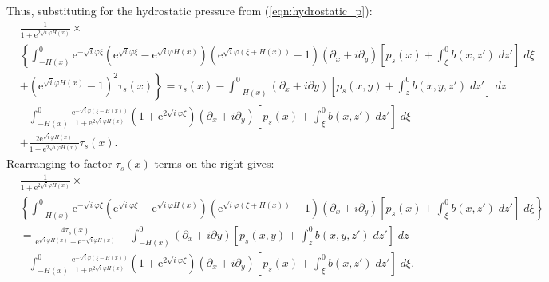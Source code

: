 \documentclass[10pt]{amsart}
\begin{document}
Thus, substituting for the hydrostatic pressure from (\ref{eqn:hydrostatic_p}):
 \begin{align}
& \frac{1}{{ 1 + \mathrm{e}^{2 \sqrt{i} \varphi H(x )} } } \times \nonumber \\
& \left\{
 \int_{-H(x)}^{0} 
\mathrm{e}^{-\sqrt{i} \varphi \xi} 
\left(
\mathrm{e}^{\sqrt{i} \varphi \xi} - 
\mathrm{e}^{\sqrt{i} \varphi H(x)} 
\right) \left(
\mathrm{e}^{\sqrt{i} \varphi  \left( \xi + H(x) \right)} - 1
\right)
 \left( \partial_x  + i \partial_y  \right)
\left[
 p_s (x) + \int_{\xi}^{0} b(x,z') \; dz'  \right]
 \; d \xi   \right. \nonumber \\
& + \left.
\left( 
\mathrm{e}^{\sqrt{i} \varphi  H(x) }   - 1   
\right)^2
\tau_s (x)  \right\} 
 = \tau_s (x) 
 - 
 \int_{-H(x)}^{0} \left( \partial_x + i \partial y \right) \left[ 
 p_s(x,y) + \int_{z}^{0} b(x,y,z') \; dz'
 \right] \; dz  
  \nonumber \\
&- 
\int_{-H(x)}^{0} 
\frac{ \mathrm{e}^{-\sqrt{i} \varphi (\xi - H(x))  } }{ 1 + \mathrm{e}^{2 \sqrt{i} \varphi H \left(x \right)} }
\left( 1 + \mathrm{e}^{2 \sqrt{i} \varphi \xi}\right) 
  \left( \partial_x  + i \partial_y  \right)
\left[
 p_s (x) + \int_{\xi}^{0} b(x,z') \; dz'  \right]
 \; d \xi \nonumber \\
& +
\frac{ 2 \mathrm{e}^{\sqrt{i} \varphi H(x)  } }{ 1 + \mathrm{e}^{2 \sqrt{i} \varphi H \left(x \right)} }
\tau_s (x)
. \nonumber
\end{align}
Rearranging to factor $\tau_s (x)$ terms on the right gives:
 \begin{align}
& \frac{1}{{1 + \mathrm{e}^{2 \sqrt{i} \varphi H(x )} } } \times \nonumber \\
& \left\{
 \int_{-H(x)}^{0} 
\mathrm{e}^{-\sqrt{i} \varphi \xi} 
\left(
\mathrm{e}^{\sqrt{i} \varphi \xi} - 
\mathrm{e}^{\sqrt{i} \varphi H(x)} 
\right) \left(
\mathrm{e}^{\sqrt{i} \varphi  \left( \xi + H(x) \right)} - 1
\right)
 \left( \partial_x  + i \partial_y  \right)
\left[
 p_s (x) + \int_{\xi}^{0} b(x,z') \; dz'  \right]
 \; d \xi   \right\} \nonumber \\
& = \frac{4 \tau_s (x)}{\mathrm{e}^{\sqrt{i} \varphi H(x)} + \mathrm{e}^{-\sqrt{i} \varphi H(x)}}  
 - 
\int_{-H(x)}^{0} \left( \partial_x + i \partial y \right) \left[ 
 p_s(x,y) + \int_{z}^{0} b(x,y,z') \; dz'
 \right] \; dz  
  \nonumber \\
&- 
\int_{-H(x)}^{0} 
\frac{ \mathrm{e}^{-\sqrt{i} \varphi (\xi - H(x))  } }{ 1 + \mathrm{e}^{2 \sqrt{i} \varphi H \left(x \right)} }
\left( 1 + \mathrm{e}^{2 \sqrt{i} \varphi \xi}\right) 
  \left( \partial_x  + i \partial_y  \right)
\left[
 p_s (x) + \int_{\xi}^{0} b(x,z') \; dz'  \right]
 \; d \xi 
. \nonumber
\end{align}
\end{document}
